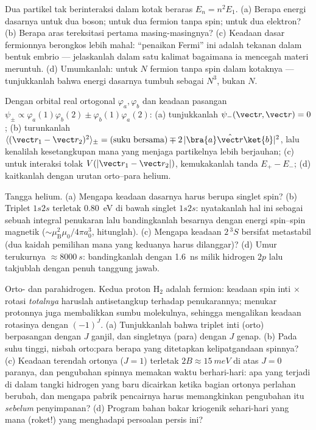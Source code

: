 \begin{exercise}[$\star\star$]\label{exo:b3:identical-particles:5}
Dua partikel tak berinteraksi dalam kotak beraras $E_n = n^2E_1$.
(a) Berapa energi dasarnya untuk dua boson; untuk dua fermion tanpa
spin; untuk dua elektron? (b) Berapa aras tereksitasi pertama
masing-masingnya? (c) Keadaan dasar fermionnya berongkos lebih mahal:
``penaikan Fermi'' ini adalah tekanan dalam bentuk embrio ---
jelaskanlah dalam satu kalimat bagaimana ia mencegah materi meruntuh.
(d) Umumkanlah: untuk $N$ fermion tanpa spin dalam kotaknya ---
tunjukkanlah bahwa energi dasarnya tumbuh sebagai $N^3$, bukan $N$.
\end{exercise}

\begin{exercise}[$\star\star$]\label{exo:b3:identical-particles:6}
Dengan orbital real ortogonal $\varphi_a, \varphi_b$ dan keadaan
pasangan $\psi_\pm \propto \varphi_a(1)\varphi_b(2) \pm
\varphi_b(1)\varphi_a(2)$: (a) tunjukkanlah $\psi_-(\vect r, \vect r) = 0$;
(b) turunkanlah
$\langle(\vect r_1 - \vect r_2)^2\rangle_\pm =
(\text{suku bersama}) \mp 2\,|\bra{a}\hat{\vect r}\ket{b}|^2$, lalu
kenalilah kesetangkupan mana yang menjaga partikelnya lebih berjauhan;
(c) untuk interaksi tolak $V(|\vect r_1 - \vect r_2|)$, kemukakanlah
tanda $E_+ - E_-$; (d) kaitkanlah dengan urutan orto--para helium.
\end{exercise}

\begin{exercise}[$\star\star$]\label{exo:b3:identical-particles:7}
Tangga helium. (a) Mengapa keadaan dasarnya harus berupa singlet spin?
(b) Triplet $1s2s$ terletak \qty{0.80}{eV} di bawah singlet $1s2s$:
nyatakanlah hal ini sebagai sebuah integral penukaran lalu bandingkanlah
besarnya dengan energi spin--spin magnetik ($\sim\mu_{\text{B}}^2\mu_0/4\pi
a_0^3$, hitunglah). (c) Mengapa keadaan $2\,^3S$ bersifat metastabil
(dua kaidah pemilihan mana yang keduanya harus dilanggar)? (d) Umur
terukurnya $\approx\qty{8000}{s}$: bandingkanlah dengan \qty{1.6}{ns}
milik hidrogen $2p$ lalu takjublah dengan penuh tanggung jawab.
\end{exercise}

\begin{exercise}[$\star\star$]\label{exo:b3:identical-particles:8}
Orto- dan parahidrogen. Kedua proton H$_2$ adalah fermion: keadaan spin
inti $\times$ rotasi \emph{totalnya} haruslah antisetangkup terhadap
penukarannya; menukar protonnya juga membalikkan sumbu molekulnya,
sehingga mengalikan keadaan rotasinya dengan $(-1)^J$. (a) Tunjukkanlah
bahwa triplet inti (orto) berpasangan dengan $J$ ganjil, dan singletnya
(para) dengan $J$ genap. (b) Pada suhu tinggi, nisbah orto:para berapa
yang ditetapkan kelipatgandaan spinnya? (c) Keadaan terendah ortonya
($J = 1$) terletak $2B \approx \qty{15}{meV}$ di atas $J = 0$ paranya,
dan pengubahan spinnya memakan waktu berhari-hari: apa yang terjadi di
dalam tangki hidrogen yang baru dicairkan ketika bagian ortonya perlahan
berubah, dan mengapa pabrik pencairnya harus memangkinkan pengubahan itu
\emph{sebelum} penyimpanan? (d) Program bahan bakar kriogenik
sehari-hari yang mana (roket!) yang menghadapi persoalan persis ini?
\end{exercise}

